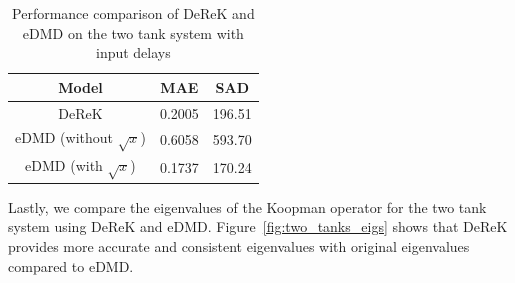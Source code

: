 \documentclass[conference]{IEEEtran}
\begin{document}
\begin{table}[htbp]\label{tab:two_tanks_results}
    \caption{Performance comparison of DeReK and eDMD on the two tank system with input delays}
    \begin{center}
        \begin{tabular}{c| S[table-format=1.4] S[table-format=3.2]}
            \toprule
            \textbf{Model}              & \textbf{MAE} & \textbf{SAD} \\
            \midrule
            DeReK                       & 0.2005       & 196.51       \\
            eDMD (without \(\sqrt{x}\)) & 0.6058       & 593.70       \\
            eDMD (with \(\sqrt{x}\))    & 0.1737       & 170.24       \\
            \bottomrule
        \end{tabular}
    \end{center}
\end{table}

Lastly, we compare the eigenvalues of the Koopman operator for the two tank system using DeReK and eDMD. Figure~\ref{fig:two_tanks_eigs} shows that DeReK provides more accurate and consistent eigenvalues with original eigenvalues compared to eDMD.
\end{document}
